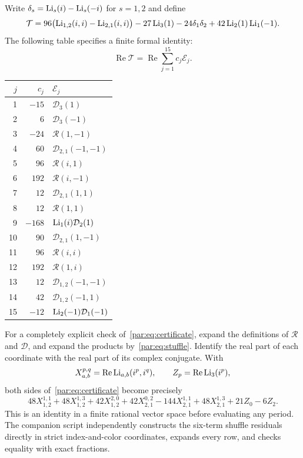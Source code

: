 Write $\delta_s=\operatorname{Li}_s(i)-\operatorname{Li}_s(-i)$ for $s=1,2$ and define
\begin{equation}\label{par:eq:target}
 \mathcal T=
 96\bigl(\operatorname{Li}_{1,2}(i,i)-\operatorname{Li}_{2,1}(i,i)\bigr)
 -27\operatorname{Li}_3(1)-24\delta_1\delta_2
 +42\operatorname{Li}_2(1)\operatorname{Li}_1(-1).
\end{equation}
The following table specifies a finite formal identity:
\begin{equation}\label{par:eq:certificate}
 \operatorname{Re}\mathcal T
   =\operatorname{Re}\sum_{j=1}^{15}c_j\mathcal E_j.
\end{equation}
\begin{center}
\begin{tabular}{r r l}
\hline
$j$ & $c_j$ & $\mathcal E_j$ \\
\hline
1 & $-15$ & $\mathcal D_3(1)$ \\
2 & $6$ & $\mathcal D_3(-1)$ \\
3 & $-24$ & $\mathcal R(1,-1)$ \\
4 & $60$ & $\mathcal D_{2,1}(-1,-1)$ \\
5 & $96$ & $\mathcal R(i,1)$ \\
6 & $192$ & $\mathcal R(i,-1)$ \\
7 & $12$ & $\mathcal D_{2,1}(1,1)$ \\
8 & $12$ & $\mathcal R(1,1)$ \\
9 & $-168$ & $\operatorname{Li}_1(i)\mathcal D_2(1)$ \\
10 & $90$ & $\mathcal D_{2,1}(1,-1)$ \\
11 & $96$ & $\mathcal R(i,i)$ \\
12 & $192$ & $\mathcal R(1,i)$ \\
13 & $12$ & $\mathcal D_{1,2}(-1,-1)$ \\
14 & $42$ & $\mathcal D_{1,2}(-1,1)$ \\
15 & $-12$ & $\operatorname{Li}_2(-1)\mathcal D_1(-1)$ \\
\hline
\end{tabular}
\end{center}

For a completely explicit check of~\eqref{par:eq:certificate}, expand
the definitions of $\mathcal R$ and $\mathcal D$, and expand the products
by~\eqref{par:eq:stuffle}. Identify the real part of each coordinate with
the real part of its complex conjugate. With
\[
 X_{a,b}^{p,q}=\operatorname{Re}\operatorname{Li}_{a,b}(i^p,i^q),
 \qquad Z_p=\operatorname{Re}\operatorname{Li}_3(i^p),
\]
both sides of~\eqref{par:eq:certificate} become precisely
\begin{equation}\label{par:eq:expanded-certificate}
 48X_{1,2}^{1,1}+48X_{1,2}^{1,3}+42X_{1,2}^{2,0}
 +42X_{2,1}^{0,2}-144X_{2,1}^{1,1}+48X_{2,1}^{1,3}
 +21Z_0-6Z_2.
\end{equation}
This is an identity in a finite rational vector space before evaluating
any period. The companion script independently constructs the six-term
shuffle residuals directly in strict index-and-color coordinates,
expands every row, and checks equality with exact fractions.

